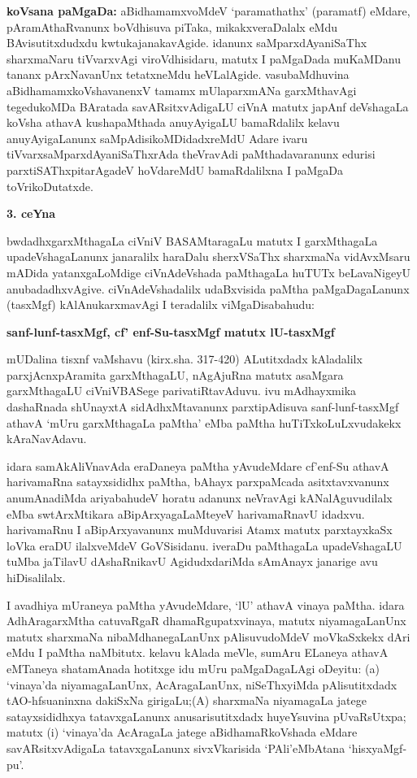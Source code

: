 {\bf koVsana paMgaDa:} aBidhamamxvoMdeV `paramathathx' (paramatf) eMdare, pAramAthaR\-vanunx boVdhisuva piTaka, mikakxveraDalalx eMdu BAvisutitxdudxdu kwtukajanakavAgide. idanunx saMparxdAyaniSaThx sharxmaNaru tiVvarxvAgi viroVdhisidaru, matutx I paMgaDada muKaMDanu tananx pArxNavanUnx tetatxneMdu heVLalAgide. vasubaMdhuvina aBidhamamxkoVshavanenxV tamamx mUlaparxmANa garxMthavAgi tegedukoMDa BAratada savARsitxvAdigaLU ciVnA matutx japAnf deVshagaLa koVsha athavA  kushapaMthada anuyAyigaLU bamaRdalilx kelavu anuyAyigaLanunx saMpAdisikoMDidadxreMdU Adare ivaru tiVvarx\-saMparxdAyaniSaThxrAda theVravAdi paMthadavaranunx edurisi parxtiSAThxpitarAgadeV hoVda\-reMdU bamaRdalilxna I paMgaDa toVrikoDutatxde.

\begin{center}
{\textbf{\Large 3. ceYna}}
\end{center}

bwdadhxgarxMthagaLa ciVniV BASAMtaragaLu matutx I garxMthagaLa upadeVshagaLanunx janaralilx haraDalu sherxVSaThx sharxmaNa vidAvxMsaru mADida yatanxgaLoMdige ciVnAdeVshada paMthagaLa huTUTx beLavaNigeyU anubadadhxvAgive. ciVnAdeVshadalilx udaBxvisida paMtha paMgaDagaLanunx (tasxMgf) kAlAnukarxmavAgi I teradalilx viMgaDisabahudu:

\begin{center}
{\textbf{\Large sanf-lunf-tasxMgf, cf' enf-Su-tasxMgf matutx lU-tasxMgf}}
\end{center}

mUDalina tisxnf vaMshavu (kirx.sha. 317-420) ALutitxdadx kAladalilx parxjAcnxpAramita garxMthagaLU, nAgAjuRna matutx asaMgara garxMthagaLU ciVniVBASege parivatiRtavAduvu. ivu mAdhayxmika dashaRnada shUnayxtA sidAdhxMtavanunx parxtipAdisuva sanf-lunf-tasxMgf athavA `mUru garxMthagaLa paMtha' eMba paMtha huTiTxkoLuLxvudakekx kAraNavAdavu. 

idara samAkAliVnavAda eraDaneya paMtha yAvudeMdare cf'enf-Su athavA harivamaRna satayxsididhx paMtha, bAhayx parxpaMcada asitxtavxvanunx anumAnadiMda ariyabahudeV horatu adanunx neVravAgi kANalAguvudilalx eMba swtArxMtikara aBipArxyagaLaMteyeV harivamaRnavU idadxvu. harivamaRnu I aBipArxyavanunx muMduvarisi Atamx matutx parxtayxkaSx loVka eraDU ilalxveMdeV GoVSisidanu. iveraDu paMthagaLa upadeVshagaLU tuMba jaTilavU dAshaRnikavU AgidudxdariMda sAmAnayx janarige avu hiDisalilalx.

I avadhiya mUraneya paMtha yAvudeMdare, `lU' athavA vinaya paMtha. idara AdhAragarxMtha catuvaRgaR dhamaRgupatxvinaya, matutx niyamagaLanUnx matutx sharxmaNa nibaMdhanegaLanUnx pAlisuvudoMdeV moVkaSxkekx dAri eMdu I paMtha naMbitutx. kelavu kAlada meVle, sumAru ELaneya athavA eMTaneya shatamAnada hotitxge idu mUru paMgaDagaLAgi oDeyitu: (a) `vinaya'da niyama\-gaLanUnx, AcAragaLanUnx, niSeThxyiMda pAlisutitxdadx tAO-hfsuaninxna dakiSxNa girigaLu;\break (A) sharxmaNa niyamagaLa jatege satayxsididhxya tatavxgaLanunx anusarisutitxdadx huyeYsuvina pUvaRsUtxpa; matutx (i) `vinaya'da AcAragaLa jatege aBidhamaRkoVshada eMdare savARsitxvAdigaLa tatavxgaLanunx sivxVkarisida `PAli'eMbAtana `hisxyaMgf-pu'.



